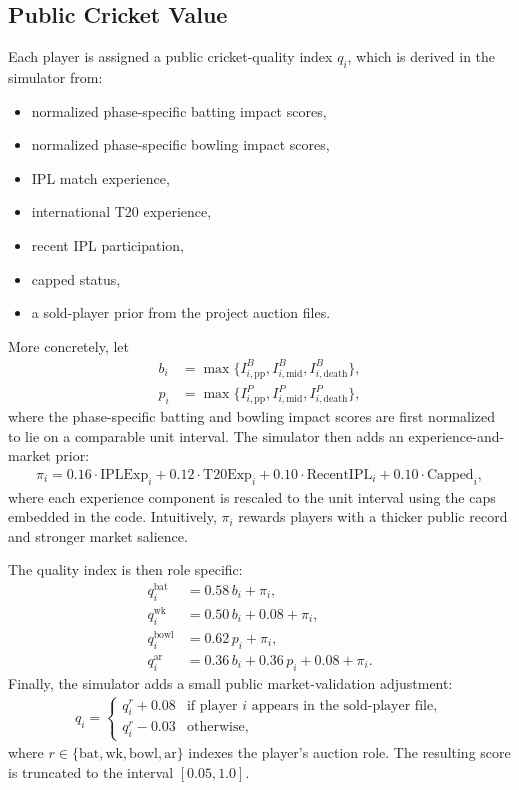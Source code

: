 \documentclass[11pt]{article}
\begin{document}
\subsection{Public Cricket Value}

Each player is assigned a public cricket-quality index \(q_i\), which is derived in the simulator from:
\begin{itemize}[leftmargin=1.5em]
    \item normalized phase-specific batting impact scores,
    \item normalized phase-specific bowling impact scores,
    \item IPL match experience,
    \item international T20 experience,
    \item recent IPL participation,
    \item capped status,
    \item a sold-player prior from the project auction files.
\end{itemize}

More concretely, let
\begin{align}
b_i &= \max\{I^{B}_{i,\text{pp}}, I^{B}_{i,\text{mid}}, I^{B}_{i,\text{death}}\},\\
p_i &= \max\{I^{P}_{i,\text{pp}}, I^{P}_{i,\text{mid}}, I^{P}_{i,\text{death}}\},
\end{align}
where the phase-specific batting and bowling impact scores are first normalized to lie on a comparable unit interval. The simulator then adds an experience-and-market prior:
\begin{align}
\pi_i
=
0.16\cdot \text{IPLExp}_i
+ 0.12\cdot \text{T20Exp}_i
+ 0.10\cdot \text{RecentIPL}_i
+ 0.10\cdot \text{Capped}_i,
\end{align}
where each experience component is rescaled to the unit interval using the caps embedded in the code. Intuitively, \(\pi_i\) rewards players with a thicker public record and stronger market salience.

The quality index is then role specific:
\begin{align}
q_i^{\text{bat}} &= 0.58\, b_i + \pi_i,\\
q_i^{\text{wk}} &= 0.50\, b_i + 0.08 + \pi_i,\\
q_i^{\text{bowl}} &= 0.62\, p_i + \pi_i,\\
q_i^{\text{ar}} &= 0.36\, b_i + 0.36\, p_i + 0.08 + \pi_i.
\end{align}
Finally, the simulator adds a small public market-validation adjustment:
\begin{align}
q_i
=
\begin{cases}
q_i^{r}+0.08 & \text{if player } i \text{ appears in the sold-player file},\\
q_i^{r}-0.03 & \text{otherwise},
\end{cases}
\end{align}
where \(r\in\{\text{bat},\text{wk},\text{bowl},\text{ar}\}\) indexes the player's auction role. The resulting score is truncated to the interval \([0.05,1.0]\).
\end{document}
